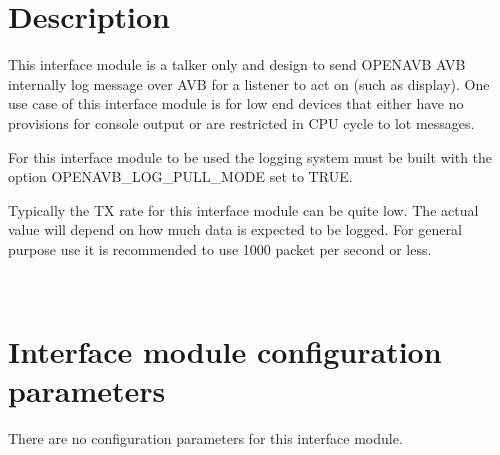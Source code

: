 \section*{Description}

This interface module is a talker only and design to send O\+P\+E\+N\+A\+VB A\+VB internally log message over A\+VB for a listener to act on (such as display). One use case of this interface module is for low end devices that either have no provisions for console output or are restricted in C\+PU cycle to lot messages.

For this interface module to be used the logging system must be built with the option O\+P\+E\+N\+A\+V\+B\+\_\+\+L\+O\+G\+\_\+\+P\+U\+L\+L\+\_\+\+M\+O\+DE set to T\+R\+UE.

Typically the TX rate for this interface module can be quite low. The actual value will depend on how much data is expected to be logged. For general purpose use it is recommended to use 1000 packet per second or less.

~\newline
 \section*{Interface module configuration parameters}

There are no configuration parameters for this interface module. 
